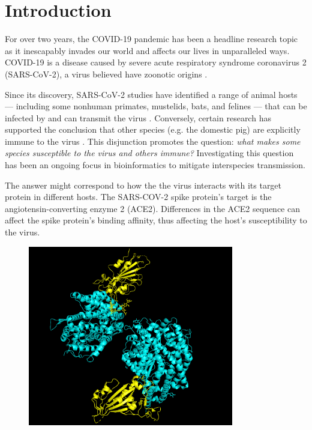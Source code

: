 \section{Introduction}

For over two years, the COVID-19 pandemic has been a headline research topic as it inescapably invades our world and affects our lives in unparalleled ways. COVID-19 is a disease caused by severe acute respiratory
syndrome coronavirus 2 (SARS-CoV-2), a virus believed have
zoonotic origins \cite{Andersen2020}.

Since its discovery, SARS-CoV-2 studies have identified a range of animal hosts --- including some nonhuman primates,  mustelids, bats, and felines --- that can be infected by and can transmit the virus \cite{Luan2020,Woolsey2020,OIE2022,OudeMunnink2021,Schlottau2020,Sreenivasan2020,Leroy2020}. Conversely, certain research has supported the conclusion that other species (e.g. the domestic pig) are explicitly immune to the virus \cite{Luan2020,Sreenivasan2020,Zhao2020,Shi2020}. This disjunction promotes the question: \emph{what makes some species susceptible to the virus and others immune?} Investigating this question has been an ongoing focus in bioinformatics to mitigate interspecies transmission.

The answer might correspond to how the the virus interacts with its target protein in different hosts. The SARS-COV-2 spike protein’s target is the angiotensin-converting enzyme 2 (ACE2). Differences in the ACE2 sequence can affect the spike protein’s binding affinity, thus affecting the host’s susceptibility to the virus.

\begin{figure}[h]
    \centering
    \includegraphics[width=0.8\textwidth]{figures/RBD-interaction.png}
\end{figure}

